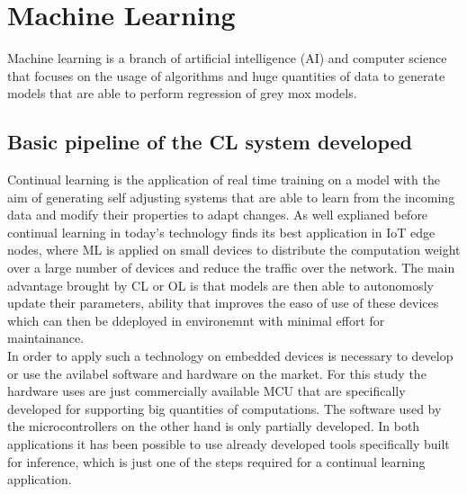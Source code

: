 \documentclass[12pt]{report}
\begin{document}
\chapter{Machine Learning}

Machine learning is a branch of artificial intelligence (AI) and computer science that focuses on the usage of algorithms and huge quantities of data to generate models that are able to perform regression of grey mox models. 

\section{Basic pipeline of the CL system developed}
Continual learning is the application of real time training on a model with the aim of generating self adjusting systems that are able to learn from the incoming data and modify their properties to adapt changes. As well explianed before continual learning in today's technology finds its best application in IoT edge nodes, where ML is applied on small devices to distribute the computation weight over a large number of devices and reduce the traffic over the network. The main advantage brought by CL or OL is that models are then able to autonomosly update their parameters, ability that improves the easo of use of these devices which can then be ddeployed in environemnt with minimal effort for maintainance. \\
In order to apply such a technology on embedded devices is necessary to develop or use the avilabel software and hardware on the market. For this study the hardware uses are just commercially available MCU that are specifically developed for supporting big quantities of computations. The software used by the microcontrollers on the other hand is only partially developed. In both applications it has been possible to use already developed tools specifically built for inference, which is just one of the steps required for a continual learning application. \\
\end{document}
